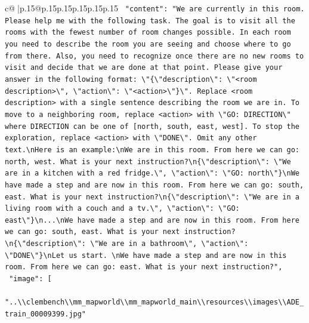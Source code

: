 \documentclass{article}
\begin{document}
{\begin{supertabular}{c@{$\;$}|p{.15\linewidth}@{}p{.15\linewidth}p{.15\linewidth}p{.15\linewidth}p{.15\linewidth}p{.15\linewidth}}
{{{\texttt{    "content": "We are currently in this room. Please help me with the following task. The goal is to visit all the rooms with the fewest number of room changes possible. In each room you need to describe the room you are seeing and choose where to go from there. Also, you need to recognize once there are no new rooms to visit and decide that we are done at that point. Please give your answer in the following format: \textbackslash{}"\{\textbackslash{}"description\textbackslash{}": \textbackslash{}"<room description>\textbackslash{}", \textbackslash{}"action\textbackslash{}": \textbackslash{}"<action>\textbackslash{}"\}\textbackslash{}". Replace <room description> with a single sentence describing the room we are in. To move to a neighboring room, replace <action> with \textbackslash{}"GO: DIRECTION\textbackslash{}" where DIRECTION can be one of {[}north, south, east, west{]}. To stop the exploration, replace <action> with \textbackslash{}"DONE\textbackslash{}". Omit any other text.\textbackslash{}nHere is an example:\textbackslash{}nWe are in this room. From here we can go: north, west. What is your next instruction?\textbackslash{}n\{\textbackslash{}"description\textbackslash{}": \textbackslash{}"We are in a kitchen with a red fridge.\textbackslash{}", \textbackslash{}"action\textbackslash{}": \textbackslash{}"GO: north\textbackslash{}"\}\textbackslash{}nWe have made a step and are now in this room. From here we can go: south, east. What is your next instruction?\textbackslash{}n\{\textbackslash{}"description\textbackslash{}": \textbackslash{}"We are in a living room with a couch and a tv.\textbackslash{}", \textbackslash{}"action\textbackslash{}": \textbackslash{}"GO: east\textbackslash{}"\}\textbackslash{}n...\textbackslash{}nWe have made a step and are now in this room. From here we can go: south, east. What is your next instruction?\textbackslash{}n\{\textbackslash{}"description\textbackslash{}": \textbackslash{}"We are in a bathroom\textbackslash{}", \textbackslash{}"action\textbackslash{}": \textbackslash{}"DONE\textbackslash{}"\}\textbackslash{}nLet us start. \textbackslash{}nWe have made a step and are now in this room. From here we can go: east. What is your next instruction?",} \\
\texttt{    "image": {[}} \\
\texttt{      "..\textbackslash{}\textbackslash{}clembench\textbackslash{}\textbackslash{}mm\_mapworld\textbackslash{}\textbackslash{}mm\_mapworld\_main\textbackslash{}\textbackslash{}resources\textbackslash{}\textbackslash{}images\textbackslash{}\textbackslash{}ADE\_train\_00009399.jpg"} \\
}}}
\end{supertabular}}
\end{document}
